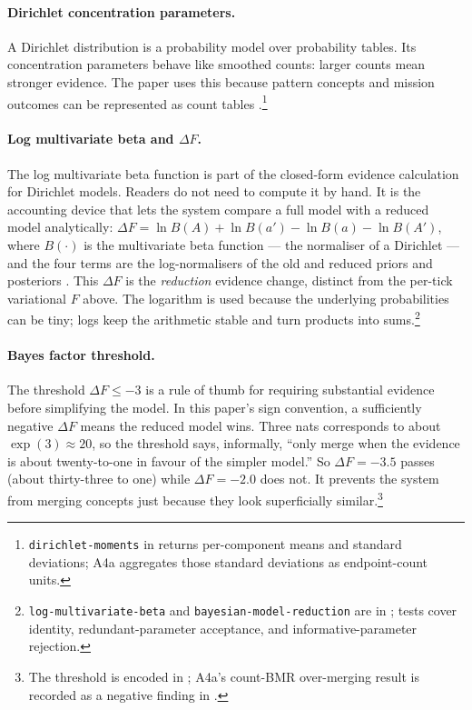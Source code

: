 \paragraph{Dirichlet concentration parameters.} A Dirichlet distribution is a probability model over probability tables.  Its concentration parameters behave like smoothed counts: larger counts mean stronger evidence.  The paper uses this because pattern concepts and mission outcomes can be represented as count tables \cite{neacsu2024structure}.\footnote{\texttt{dirichlet-moments} in  returns per-component means and standard deviations; A4a aggregates those standard deviations as endpoint-count units.}

\paragraph{Log multivariate beta and $\Delta F$.} The log multivariate beta function is part of the closed-form evidence calculation for Dirichlet models.  Readers do not need to compute it by hand.  It is the accounting device that lets the system compare a full model with a reduced model analytically: $\Delta F = \ln B(A) + \ln B(a') - \ln B(a) - \ln B(A')$, where $B(\cdot)$ is the multivariate beta function --- the normaliser of a Dirichlet --- and the four terms are the log-normalisers of the old and reduced priors and posteriors \cite{neacsu2024structure}.  This $\Delta F$ is the \emph{reduction} evidence change, distinct from the per-tick variational $F$ above.  The logarithm is used because the underlying probabilities can be tiny; logs keep the arithmetic stable and turn products into sums.\footnote{\texttt{log-multivariate-beta} and \texttt{bayesian-model-reduction} are in ; tests cover identity, redundant-parameter acceptance, and informative-parameter rejection.}

\paragraph{Bayes factor threshold.} The threshold $\Delta F \le -3$ is a rule of thumb for requiring substantial evidence before simplifying the model.  In this paper's sign convention, a sufficiently negative $\Delta F$ means the reduced model wins.  Three nats corresponds to about $\exp(3)\approx20$, so the threshold says, informally, ``only merge when the evidence is about twenty-to-one in favour of the simpler model.''  So $\Delta F=-3.5$ passes (about thirty-three to one) while $\Delta F=-2.0$ does not.  It prevents the system from merging concepts just because they look superficially similar.\footnote{The threshold is encoded in ; A4a's count-BMR over-merging result is recorded as a negative finding in .}

